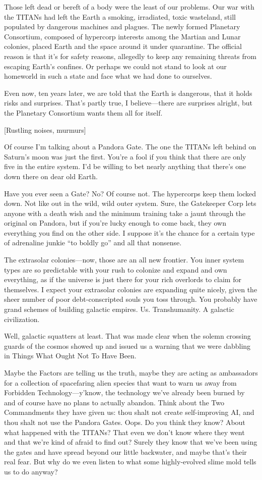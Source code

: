Those left dead or bereft of a body were the least of our
problems. Our war with the TITANs had left the Earth a smoking,
irradiated, toxic wasteland, still populated by dangerous machines and
plagues. The newly formed Planetary Consortium, composed of hypercorp
interests among the Martian and Lunar colonies, placed Earth and the
space around it under quarantine. The official reason is that it's for
safety reasons, allegedly to keep any remaining threats from escaping
Earth's confines. Or perhaps we could not stand to look at our
homeworld in such a state and face what we had done to ourselves.

Even now, ten years later, we are told that the Earth is dangerous,
that it holds risks and surprises. That's partly true, I believe—there
are surprises alright, but the Planetary Consortium wants them all for
itself.

[Rustling noises, murmurs]

Of course I'm talking about a Pandora Gate. The one the TITANs left
behind on Saturn's moon was just the first. You're a fool if you think
that there are only five in the entire system. I'd be willing to bet
nearly anything that there's one down there on dear old Earth.

Have you ever seen a Gate? No? Of course not.  The hypercorps keep
them locked down. Not like out in the wild, wild outer system. Sure,
the Gatekeeper Corp lets anyone with a death wish and the minimum
training take a jaunt through the original on Pandora, but if you're
lucky enough to come back, they own everything you find on the other
side. I suppose it's the chance for a certain type of adrenaline
junkie “to boldly go” and all that nonsense.

The extrasolar colonies—now, those are an all new frontier. You inner
system types are so predictable with your rush to colonize and expand
and own everything, as if the universe is just there for your rich
overlords to claim for themselves. I expect your extrasolar colonies
are expanding quite nicely, given the sheer number of poor
debt-conscripted souls you toss through. You probably have grand
schemes of building galactic empires. Us. Transhumanity. A galactic
civilization.

Well, galactic squatters at least. That was made clear when the solemn
crossing guards of the cosmos showed up and issued us a warning that
we were dabbling in Things What Ought Not To Have Been.

Maybe the Factors are telling us the truth, maybe they are acting as
ambassadors for a collection of spacefaring alien species that want to
warn us away from Forbidden Technology—y'know, the technology we've
already been burned by and of course have no plans to actually
abandon. Think about the Two Commandments they have given us: thou
shalt not create self-improving AI, and thou shalt not use the Pandora
Gates. Oops. Do you think they know? About what happened with the
TITANs? That even we don't know where they went and that we're kind of
afraid to find out? Surely they know that we've been using the gates
and have spread beyond our little backwater, and maybe that's their
real fear. But why do we even listen to what some highly-evolved slime
mold tells us to do anyway?

